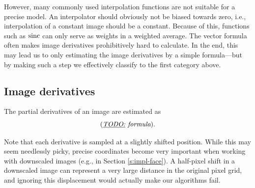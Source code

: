 However, many commonly used interpolation functions are not suitable for a precise model.
An interpolator should obviously not be biased towards zero, i.e., interpolation of a constant image should be a constant.
Because of this, functions such as $\mathrm{sinc}$ can only serve as weights in a weighted average.
The vector formula  often makes image derivatives prohibitively hard to calculate.
In the end, this may lead us to only estimating the image derivatives by a simple formula---but by making such a step we effectively classify to the first category above.

\subsection{Image derivatives}
The partial derivatives of an image are estimated as
$$(\textit{\underline{TODO:} formula}).$$

Note that each derivative is sampled at a slightly shifted position.
While this may seem needlessly picky, precise coordinates become very important when working with downscaled images (e.g., in Section \ref{s:impl-face}).
A half-pixel shift in a downscaled image can represent a very large distance in the original pixel grid, and ignoring this displacement would actually make our algorithms fail.
